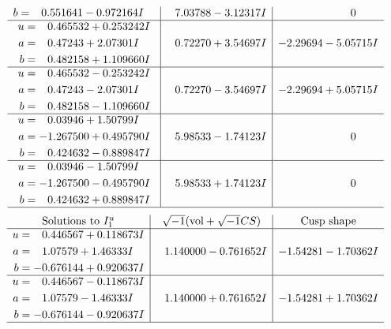 \documentclass[1p]{elsarticle_modified}
\theoremstyle{definition}
\newcommand{\I}{\sqrt{-1}}
\begin{document}
$$\begin{array}{c|c|c}
\begin{aligned}
b &= \phantom{-}0.551641 - 0.972164 I\end{aligned}
 & \phantom{-}7.03788 - 3.12317 I & \phantom{-0.000000 } 0 \\ \hline\begin{aligned}
u &= \phantom{-}0.465532 + 0.253242 I \\
a &= \phantom{-}0.47243 + 2.07301 I \\
b &= \phantom{-}0.482158 + 1.109660 I\end{aligned}
 & \phantom{-}0.72270 + 3.54697 I & -2.29694 - 5.05715 I \\ \hline\begin{aligned}
u &= \phantom{-}0.465532 - 0.253242 I \\
a &= \phantom{-}0.47243 - 2.07301 I \\
b &= \phantom{-}0.482158 - 1.109660 I\end{aligned}
 & \phantom{-}0.72270 - 3.54697 I & -2.29694 + 5.05715 I \\ \hline\begin{aligned}
u &= \phantom{-}0.03946 + 1.50799 I \\
a &= -1.267500 + 0.495790 I \\
b &= \phantom{-}0.424632 - 0.889847 I\end{aligned}
 & \phantom{-}5.98533 - 1.74123 I & \phantom{-0.000000 } 0 \\ \hline\begin{aligned}
u &= \phantom{-}0.03946 - 1.50799 I \\
a &= -1.267500 - 0.495790 I \\
b &= \phantom{-}0.424632 + 0.889847 I\end{aligned}
 & \phantom{-}5.98533 + 1.74123 I & \phantom{-0.000000 } 0\\
 \hline 
 \end{array}$$\newpage$$\begin{array}{c|c|c}  
\text{Solutions to }I^u_{1}& \I (\text{vol} + \sqrt{-1}CS) & \text{Cusp shape}\\
 \hline 
\begin{aligned}
u &= \phantom{-}0.446567 + 0.118673 I \\
a &= \phantom{-}1.07579 + 1.46333 I \\
b &= -0.676144 + 0.920637 I\end{aligned}
 & \phantom{-}1.140000 - 0.761652 I & -1.54281 - 1.70362 I \\ \hline\begin{aligned}
u &= \phantom{-}0.446567 - 0.118673 I \\
a &= \phantom{-}1.07579 - 1.46333 I \\
b &= -0.676144 - 0.920637 I\end{aligned}
 & \phantom{-}1.140000 + 0.761652 I & -1.54281 + 1.70362 I\\
 \hline 
 \end{array}$$\newpage\newpage\renewcommand{\arraystretch}{1}
\end{document}
